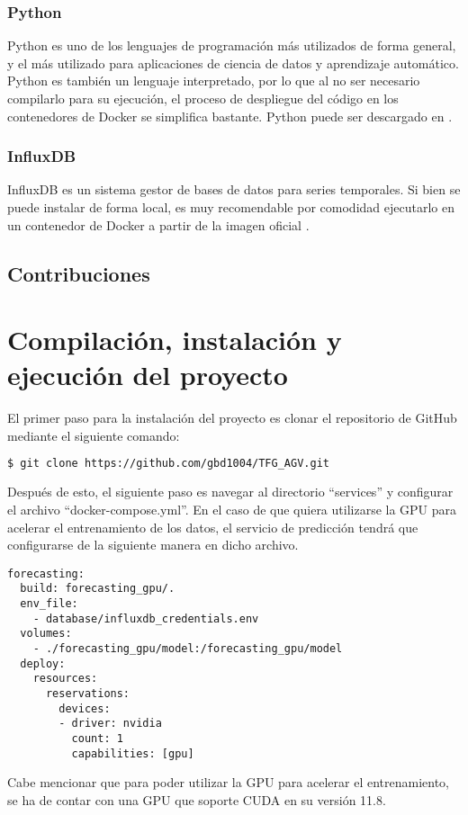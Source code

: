 \subsubsection*{Python}

Python es uno de los lenguajes de programación más utilizados de forma general, y el más utilizado para aplicaciones 
de ciencia de datos y aprendizaje automático. Python es también un lenguaje interpretado, por lo que al no ser necesario 
compilarlo para su ejecución, el proceso de despliegue del código en los contenedores de Docker se simplifica bastante.
Python puede ser descargado en \cite{python310}.

\subsubsection*{InfluxDB}

InfluxDB es un sistema gestor de bases de datos para series temporales. Si bien se puede instalar de forma local,
es muy recomendable por comodidad ejecutarlo en un contenedor de Docker a partir de la imagen oficial \cite{influx:docker}.

\subsection{Contribuciones}

\section{Compilación, instalación y ejecución del proyecto}

El primer paso para la instalación del proyecto es clonar el repositorio de GitHub mediante el siguiente comando:
\begin{lstlisting}[language=bash]
$ git clone https://github.com/gbd1004/TFG_AGV.git
\end{lstlisting}

Después de esto, el siguiente paso es navegar al directorio ``services'' y configurar el archivo ``docker-compose.yml''. 
En el caso de que quiera utilizarse la GPU para acelerar el entrenamiento de los datos, el servicio de predicción tendrá 
que configurarse de la siguiente manera en dicho archivo.
\begin{lstlisting}
forecasting:
  build: forecasting_gpu/.
  env_file:
    - database/influxdb_credentials.env
  volumes:
    - ./forecasting_gpu/model:/forecasting_gpu/model
  deploy:
    resources:
      reservations:
        devices:
        - driver: nvidia
          count: 1
          capabilities: [gpu]
\end{lstlisting}
Cabe mencionar que para poder utilizar la GPU para acelerar el entrenamiento, se ha de contar con una GPU que soporte
CUDA en su versión 11.8.

